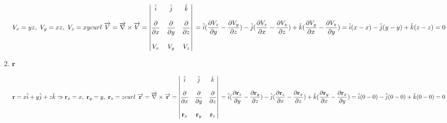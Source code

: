 \documentclass[fleqn]{article}
\begin{document}
\begin{enumerate}
\begin{enumerate}
          \textcolor{hwColor}{
            $
              V_x=yz, ~ V_y=xz, ~ V_z=xy \\ \\
              curl ~ \overrightarrow{V}=\overrightarrow{\nabla} \times \overrightarrow{V}=\begin{vmatrix}
                \hat{i} & \hat{j} & \hat{k} \\
                \\
                \dfrac{\partial }{\partial x} & \dfrac{\partial }{\partial y} & \dfrac{\partial }{\partial z} \\
                \\
                V_x & V_y & V_z 
              \end{vmatrix} \\
              \\
              =\hat{i} (\dfrac{\partial V_z}{\partial y}-\dfrac{\partial V_y}{\partial z})-\hat{j}(\dfrac{\partial V_z}{\partial x}-\dfrac{\partial V_x}{\partial z})+\hat{k} (\dfrac{\partial V_y}{\partial x}-\dfrac{\partial V_x}{\partial y}) \\
              \\
              =\hat{i}(x-x)-\hat{j}(y-y)+\hat{k}(z-z)=0
            $
          }

        \item $\mathbf{r}$

          \textcolor{hwColor}{
            $
              \mathbf{r}=x \hat{i}+y \hat{j}+z \hat{k} \Rightarrow \mathbf{r}_x=x, ~ \mathbf{r}_y=y, ~ \mathbf{r}_z=z \\ \\
              curl ~ \overrightarrow{\mathbf{r}}=\overrightarrow{\nabla} \times \overrightarrow{\mathbf{r}}=\begin{vmatrix}
                \hat{i} & \hat{j} & \hat{k} \\
                \\
                \dfrac{\partial }{\partial x} & \dfrac{\partial }{\partial y} & \dfrac{\partial }{\partial z} \\
                \\
                \mathbf{r}_x & \mathbf{r}_y & \mathbf{r}_z 
              \end{vmatrix} \\
              \\
              =\hat{i} (\dfrac{\partial \mathbf{r}_z}{\partial y}-\dfrac{\partial \mathbf{r}_y}{\partial z})-\hat{j}(\dfrac{\partial \mathbf{r}_z}{\partial x}-\dfrac{\partial \mathbf{r}_x}{\partial z})+\hat{k} (\dfrac{\partial \mathbf{r}_y}{\partial x}-\dfrac{\partial \mathbf{r}_x}{\partial y}) \\
              \\
              =\hat{i}(0-0)-\hat{j}(0-0)+\hat{k}(0-0)=0
            $
          }


\end{enumerate}
\end{enumerate}
\end{document}
